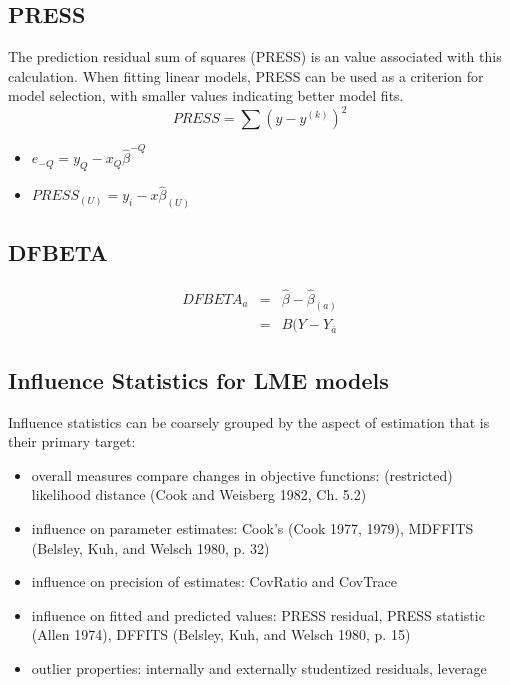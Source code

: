 \documentclass[Main.tex]{subfiles}
\begin{document}
\subsection{PRESS} %
The prediction residual sum of squares (PRESS) is an value associated with this calculation. When fitting linear models, PRESS can be used as a criterion for model selection, with smaller values indicating better model fits.
\begin{equation}
PRESS = \sum(y-y^{(k)})^2
\end{equation}


\begin{itemize}
\item $e_{-Q} = y_{Q} - x_{Q}\hat{\beta}^{-Q}$
\item $PRESS_{(U)} = y_{i} - x\hat{\beta}_{(U)}$
\end{itemize}

\subsection{DFBETA} %
\begin{eqnarray}
DFBETA_{a} &=& \hat{\beta} - \hat{\beta}_{(a)} \\
&=& B(Y-Y_{\bar{a}}
\end{eqnarray}
\subsection{Influence Statistics for LME models} %
Influence statistics can be coarsely grouped by the aspect of estimation that is their primary target:
\begin{itemize}
	\item overall measures compare changes in objective functions: (restricted) likelihood distance (Cook and Weisberg 1982, Ch. 5.2)
	\item influence on parameter estimates: Cook's  (Cook 1977, 1979), MDFFITS (Belsley, Kuh, and Welsch 1980, p. 32)
	\item influence on precision of estimates: CovRatio and CovTrace
	\item influence on fitted and predicted values: PRESS residual, PRESS statistic (Allen 1974), DFFITS (Belsley, Kuh, and Welsch 1980, p. 15)
	\item outlier properties: internally and externally studentized residuals, leverage
\end{itemize}
\end{document}

